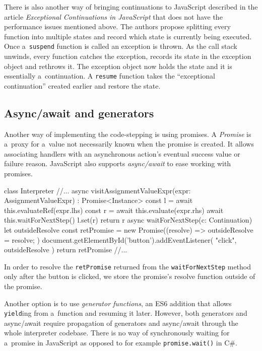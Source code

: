There is also another way of bringing continuations to JavaScript described in the article \emph{Exceptional Continuations in JavaScript}
\cite{ExceptionalContinuations} that does not have the performance issues mentioned above. The authors propose splitting every function into
multiple states and record which state is currently being executed. Once a~\texttt{suspend} function is called an exception is thrown. As
the call stack unwinds, every function catches the exception, records its state in the exception object and rethrows it. The exception object
now holds the state and it is essentially a~continuation. A \texttt{resume} function takes the ``exceptional continuation'' created earlier and restore the state.

\subsection*{Async/await and generators}
Another way of implementing the code-stepping is using promises. A \emph{Promise} is a~proxy for a~value not necessarily known when the promise is created.
It allows associating handlers with an asynchronous action's eventual success value or failure reason. JavaScript also supports \emph{async/await} to
ease working with promises.
\begin{code}
class Interpreter {
    //...
    async visitAssignmentValueExpr(expr: AssignmentValueExpr)
        : Promise<Instance> {
        const l = await this.evaluateRef(expr.lhs)
        const r = await this.evaluate(expr.rhs)
        await this.waitForNextStep()
        l.set(r)
        return r
    }
    async waitForNextStep(c: Continuation) {
        let outsideResolve
        const retPromise = new Promise((resolve) => { 
            outsideResolve = resolve; 
        })
        document.getElementById('button').addEventListener(
            "click",
            outsideResolve
        )
        return retPromise
    }
    //...
}
\end{code}
In order to resolve the \texttt{retPromise} returned from the \texttt{waitForNextStep} method only after the button is clicked, we store the promise's resolve
function outside of the promise.

Another option is to use \emph{generator functions}, an ES6 addition that allows \texttt{yield}ing from a~function and resuming it later. However, both generators
and async/await require propagation of generators and async/await through the whole interpreter codebase. There is no way of synchronously waiting for a~promise
in JavaScript as opposed to for example \texttt{promise.wait()} in C\#.
 
